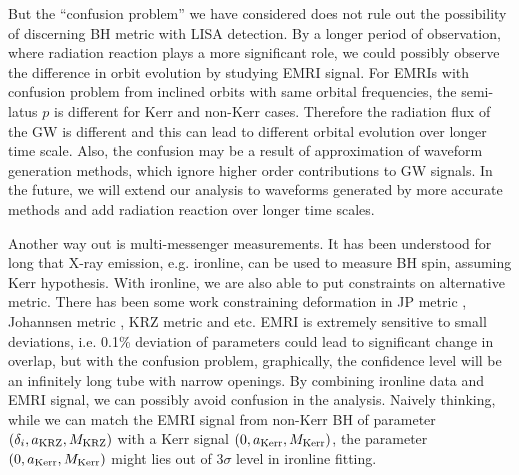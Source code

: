 \documentclass{article}
\begin{document}
But the ``confusion problem'' we have considered does not rule out the possibility of discerning BH metric with LISA detection. By a longer period of observation, where radiation reaction plays a more significant role, we could possibly observe the difference in orbit evolution by studying EMRI signal. For EMRIs with confusion problem from inclined orbits with same orbital frequencies, the semi-latus $p$ is different for Kerr and non-Kerr cases. Therefore the radiation flux of the GW is different and this can lead to different orbital evolution over longer time scale. Also, the confusion may be a result of approximation of waveform generation methods, which ignore higher order contributions to GW signals. In the future, we will extend our analysis to waveforms generated by more accurate methods and add radiation reaction over longer time scales. 

Another way out is multi-messenger measurements. It has been understood for long that X-ray emission, e.g. ironline, can be used to measure BH spin\cite{measureBHspin}, assuming Kerr hypothesis. With ironline, we are also able to put constraints on alternative metric. There has been some work constraining deformation in JP metric \cite{t1_Iron}, Johannsen metric \cite{t4_Iron}, KRZ metric \cite{cosimoKRZ} and etc. EMRI is extremely sensitive to small deviations, i.e. 0.1\% deviation of parameters could lead to significant change in overlap, but with the confusion problem, graphically, the confidence level will be an infinitely long tube with narrow openings. By combining ironline data and EMRI signal, we can possibly avoid confusion in the analysis. Naively thinking, while we can match the EMRI signal from non-Kerr BH of parameter $(\delta_i,a_{\rm KRZ},M_{\rm KRZ})$ with a Kerr signal $(0,a_{\rm Kerr}, M_{\rm Kerr})$, the parameter $(0,a_{\rm Kerr}, M_{\rm Kerr})$ might lies out of $3\sigma$ level in ironline fitting.




\end{document}

